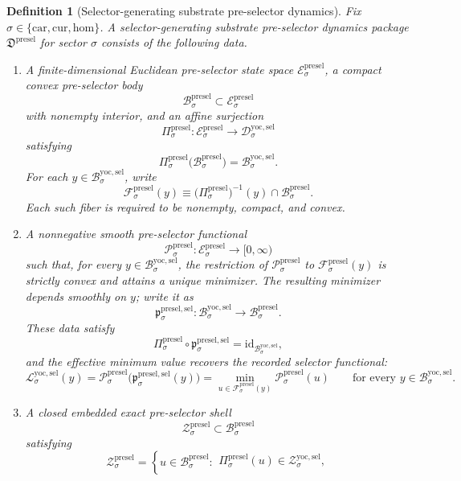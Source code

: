 \documentclass[11pt]{article}
\newcommand{\Car}{\mathrm{car}}
\newcommand{\Cur}{\mathrm{cur}}
\newcommand{\Hom}{\mathrm{hom}}
\newcommand{\YoctoSelectorSpace}[1]{\mathcal D_{#1}^{\mathrm{yoc,sel}}}
\newcommand{\YoctoSelectorBody}[1]{\mathcal B_{#1}^{\mathrm{yoc,sel}}}
\newcommand{\YoctoSelectorFunctional}[1]{\mathscr L_{#1}^{\mathrm{yoc,sel}}}
\newcommand{\YoctoSelectorShell}[1]{\mathcal Z_{#1}^{\mathrm{yoc,sel}}}
\newcommand{\PreSelectorPackage}{\mathfrak D^{\mathrm{presel}}}
\newcommand{\PreSelectorSpace}[1]{\mathcal E_{#1}^{\mathrm{presel}}}
\newcommand{\PreSelectorBody}[1]{\mathcal B_{#1}^{\mathrm{presel}}}
\newcommand{\PreSelectorProj}[1]{\Pi_{#1}^{\mathrm{presel}}}
\newcommand{\PreSelectorFiber}[2]{\mathcal F_{#1}^{\mathrm{presel}}(#2)}
\newcommand{\PreSelectorFunctional}[1]{\mathscr P_{#1}^{\mathrm{presel}}}
\newcommand{\PreSelectorSelectorMin}[1]{\mathfrak p_{#1}^{\mathrm{presel,sel}}}
\newcommand{\PreSelectorShell}[1]{\mathcal Z_{#1}^{\mathrm{presel}}}
\newtheorem{definition}{Definition}
\begin{document}
\begin{definition}[Selector-generating substrate pre-selector dynamics]
\label{def:presel}
Fix \(\sigma\in\{\Car,\Cur,\Hom\}\). A \emph{selector-generating substrate pre-selector dynamics package} \(\PreSelectorPackage\) for sector \(\sigma\) consists of the following data.
\begin{enumerate}
    \item A finite-dimensional Euclidean pre-selector state space \(\PreSelectorSpace{\sigma}\), a compact convex pre-selector body
    \[
    \PreSelectorBody{\sigma}\subset\PreSelectorSpace{\sigma}
    \]
    with nonempty interior, and an affine surjection
    \[
    \PreSelectorProj{\sigma}:\PreSelectorSpace{\sigma}\to\YoctoSelectorSpace{\sigma}
    \]
    satisfying
    \[
    \PreSelectorProj{\sigma}\bigl(\PreSelectorBody{\sigma}\bigr)=\YoctoSelectorBody{\sigma}.
    \]
    For each \(y\in\YoctoSelectorBody{\sigma}\), write
    \[
    \PreSelectorFiber{\sigma}{y}
    \equiv
    \bigl(\PreSelectorProj{\sigma}\bigr)^{-1}(y)\cap\PreSelectorBody{\sigma}.
    \]
    Each such fiber is required to be nonempty, compact, and convex.
    \item A nonnegative smooth pre-selector functional
    \[
    \PreSelectorFunctional{\sigma}:\PreSelectorSpace{\sigma}\to[0,\infty)
    \]
    such that, for every \(y\in\YoctoSelectorBody{\sigma}\), the restriction of \(\PreSelectorFunctional{\sigma}\) to \(\PreSelectorFiber{\sigma}{y}\) is strictly convex and attains a unique minimizer. The resulting minimizer depends smoothly on \(y\); write it as
    \[
    \PreSelectorSelectorMin{\sigma}:\YoctoSelectorBody{\sigma}\to\PreSelectorBody{\sigma}.
    \]
    These data satisfy
    \[
    \PreSelectorProj{\sigma}\circ\PreSelectorSelectorMin{\sigma}
    =
    \mathrm{id}_{\YoctoSelectorBody{\sigma}},
    \]
    and the effective minimum value recovers the recorded selector functional:
    \[
    \YoctoSelectorFunctional{\sigma}(y)
    =
    \PreSelectorFunctional{\sigma}\bigl(\PreSelectorSelectorMin{\sigma}(y)\bigr)
    =
    \min_{u\in\PreSelectorFiber{\sigma}{y}}
    \PreSelectorFunctional{\sigma}(u)
    \qquad
    \text{for every }
    y\in\YoctoSelectorBody{\sigma}.
    \]
    \item A closed embedded exact pre-selector shell
    \[
    \PreSelectorShell{\sigma}\subset\PreSelectorBody{\sigma}
    \]
    satisfying
    \[
    \PreSelectorShell{\sigma}
    =
    \left\{
    u\in\PreSelectorBody{\sigma}:
    \begin{array}{l}
    \PreSelectorProj{\sigma}(u)\in\YoctoSelectorShell{\sigma},\\[0.2em]

\end{array}\]
\end{enumerate}
\end{definition}
\end{document}
